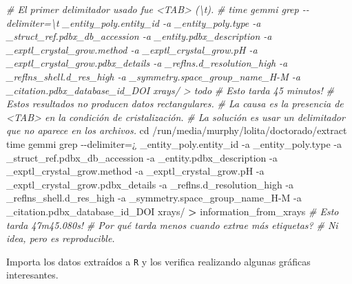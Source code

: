 \documentclass[
]{book}
\newenvironment{Shaded}{\begin{snugshade}}{\end{snugshade}}
\newcommand{\BuiltInTok}[1]{#1}
\newcommand{\CommentTok}[1]{\textcolor[rgb]{0.56,0.35,0.01}{\textit{#1}}}
\newcommand{\NormalTok}[1]{#1}
\newcommand{\OperatorTok}[1]{\textcolor[rgb]{0.81,0.36,0.00}{\textbf{#1}}}
\newcommand{\StringTok}[1]{\textcolor[rgb]{0.31,0.60,0.02}{#1}}
\begin{document}
\begin{Shaded}
\begin{Highlighting}[]
\CommentTok{\# El primer delimitador usado fue \textless{}TAB\textgreater{} (\textbackslash{}t).}
\CommentTok{\# time gemmi grep {-}{-}delimiter=\textquotesingle{}\textbackslash{}t\textquotesingle{} \_entity\_poly.entity\_id {-}a \_entity\_poly.type {-}a \_struct\_ref.pdbx\_db\_accession {-}a \_entity.pdbx\_description {-}a \_exptl\_crystal\_grow.method {-}a \_exptl\_crystal\_grow.pH {-}a \_exptl\_crystal\_grow.pdbx\_details {-}a \_reflns.d\_resolution\_high {-}a \_reflns\_shell.d\_res\_high {-}a \_symmetry.space\_group\_name\_H{-}M {-}a \_citation.pdbx\_database\_id\_DOI xrays/ \textgreater{} todo}
\CommentTok{\# Esto tarda 45 minutos! }
\CommentTok{\# Estos resultados no producen datos rectangulares. }
\CommentTok{\# La causa es la presencia de \textless{}TAB\textgreater{} en la condición de cristalización.}
\CommentTok{\# La solución es usar un delimitador que no aparece en los archivos.}
\BuiltInTok{cd}\NormalTok{ /run/media/murphy/lolita/doctorado/extract}
\BuiltInTok{time}\NormalTok{ gemmi grep {-}{-}delimiter=}\StringTok{\textquotesingle{}¿\textquotesingle{}}\NormalTok{ \_entity\_poly.entity\_id {-}a \_entity\_poly.type {-}a \_struct\_ref.pdbx\_db\_accession {-}a \_entity.pdbx\_description {-}a \_exptl\_crystal\_grow.method {-}a \_exptl\_crystal\_grow.pH {-}a \_exptl\_crystal\_grow.pdbx\_details {-}a \_reflns.d\_resolution\_high {-}a \_reflns\_shell.d\_res\_high {-}a \_symmetry.space\_group\_name\_H{-}M {-}a \_citation.pdbx\_database\_id\_DOI xrays/ }\OperatorTok{\textgreater{}}\NormalTok{ information\_from\_xrays}
\CommentTok{\# Esto tarda 47m45.080s!}
\CommentTok{\# Por qué tarda menos cuando extrae más etiquetas?}
\CommentTok{\# Ni idea, pero es reproducible.}
\end{Highlighting}
\end{Shaded}

Importa los datos extraídos a \texttt{R} y los verifica realizando algunas gráficas interesantes.
\end{document}
